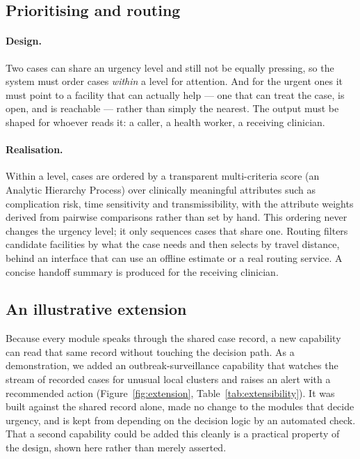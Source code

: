 \documentclass[11pt]{article}
\begin{document}
\subsection{Prioritising and routing}
\label{sec:routing}
\paragraph{Design.} Two cases can share an urgency level and still not be equally pressing, so the system
must order cases \emph{within} a level for attention. And for the urgent ones it must point to a facility
that can actually help --- one that can treat the case, is open, and is reachable --- rather than simply the
nearest. The output must be shaped for whoever reads it: a caller, a health worker, a receiving clinician.

\paragraph{Realisation.} Within a level, cases are ordered by a transparent multi-criteria score (an
Analytic Hierarchy Process) over clinically meaningful attributes such as complication risk, time
sensitivity and transmissibility, with the attribute weights derived from pairwise comparisons rather than
set by hand. This ordering never changes the urgency level; it only sequences cases that share one. Routing
filters candidate facilities by what the case needs and then selects by travel distance, behind an interface
that can use an offline estimate or a real routing service. A concise handoff summary is produced for the
receiving clinician.

\subsection{An illustrative extension}
\label{sec:extension}
Because every module speaks through the shared case record, a new capability can read that same record
without touching the decision path. As a demonstration, we added an outbreak-surveillance capability that
watches the stream of recorded cases for unusual local clusters and raises an alert with a recommended
action (Figure~\ref{fig:extension}, Table~\ref{tab:extensibility}). It was built against the shared record
alone, made no change to the modules that decide urgency, and is kept from depending on the decision logic
by an automated check. That a second capability could be added this cleanly is a practical property of the
design, shown here rather than merely asserted.
\end{document}
